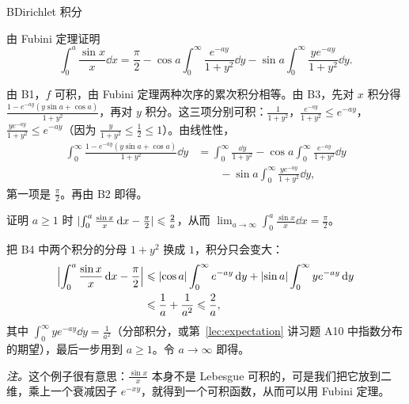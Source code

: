\begin{probleme}{B}{Dirichlet 积分}
\begin{questions}
\item 由 Fubini 定理证明
\[
\int_0^a\frac{\sin x}x\dd x=\frac\pi2-\cos a\int_0^\infty\frac{e^{-ay}}{1+y^2}\dd y-\sin a\int_0^\infty\frac{ye^{-ay}}{1+y^2}\dd y .
\]
\begin{solution}
由 B1，$f$ 可积，由 Fubini 定理两种次序的累次积分相等。由 B3，先对 $x$ 积分得 $\frac{1-e^{-ay}(y\sin a+\cos a)}{1+y^2}$，再对 $y$ 积分。这三项分别可积：$\frac1{1+y^2}$，$\frac{e^{-ay}}{1+y^2}\leqslant e^{-ay}$，$\frac{ye^{-ay}}{1+y^2}\leqslant e^{-ay}$（因为 $\frac y{1+y^2}\leqslant\frac12\leqslant1$）。由线性性，
\[
\begin{aligned}
\int_0^\infty\frac{1-e^{-ay}(y\sin a+\cos a)}{1+y^2}\dd y&=\int_0^\infty\frac{\dd y}{1+y^2}-\cos a\int_0^\infty\frac{e^{-ay}}{1+y^2}\dd y\\
&\qquad-\sin a\int_0^\infty\frac{ye^{-ay}}{1+y^2}\dd y,
\end{aligned}
\]
第一项是 $\frac\pi2$。再由 B2 即得。
\end{solution}

\item 证明 $a\geqslant1$ 时 $\lvert \int_0^a\frac{\sin x}x\,\mathrm{d} x-\frac\pi2\rvert\leqslant\frac2a$，从而 $\lim_{a\to\infty}\int_0^a\frac{\sin x}x\dd x=\frac\pi2$。
\begin{solution}
把 B4 中两个积分的分母 $1+y^2$ 换成 $1$，积分只会变大：
\[
\begin{aligned}
\Bigl\lvert\int_0^a\frac{\sin x}x\,\mathrm{d} x-\frac\pi2\Bigr\rvert&\leqslant\lvert \cos a\rvert\int_0^\infty e^{-ay}\,\mathrm{d} y+\lvert \sin a\rvert\int_0^\infty ye^{-ay}\,\mathrm{d} y\\
&\leqslant\frac1a+\frac1{a^2}\leqslant\frac2a,
\end{aligned}
\]
其中 $\int_0^\infty ye^{-ay}\dd y=\frac1{a^2}$（分部积分，或第~\ref{lec:expectation} 讲习题 A10 中指数分布的期望），最后一步用到 $a\geqslant1$。令 $a\to\infty$ 即得。

\emph{注。}这个例子很有意思：$\frac{\sin x}x$ 本身不是 Lebesgue 可积的，可是我们把它放到二维，乘上一个衰减因子 $e^{-xy}$，就得到一个可积函数，从而可以用 Fubini 定理。
\end{solution}
\end{questions}
\end{probleme}

